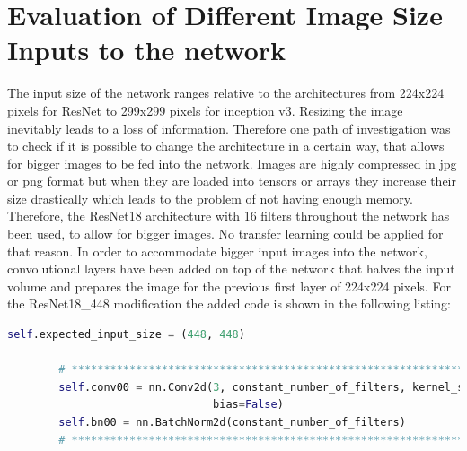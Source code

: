 \begin{table}[!h] \centering
{}
\caption{Resnet18 FiveCrop Implementation with and without pre-training. FINAL (regular) means ResNet18 with the resizing of the image instead of cropping and averaging}
\label{tbl:resnet18-randomnine}
\end{table}



\section{Evaluation of Different Image Size Inputs to the network}

The input size of the network ranges relative to the architectures from 224x224 pixels for ResNet to 299x299 pixels for inception v3. Resizing the image inevitably leads to a loss of information. Therefore one path of investigation was to check if it is possible to change the architecture in a certain way, that allows for bigger images to be fed into the network. Images are highly compressed in jpg or png format but when they are loaded into tensors or arrays they increase their size drastically which leads to the problem of not having enough memory. Therefore, the ResNet18 architecture with 16 filters throughout the network has been used, to allow for bigger images. No transfer learning could be applied for that reason. In order to accommodate bigger input images into the network, convolutional layers have been added on top of the network that halves the input volume and prepares the image for the previous first layer of 224x224 pixels. For the ResNet18\_448 modification the added code is shown in the following listing:

\begin{minipage}{\linewidth}
\begin{lstlisting}[language=Python, caption=Python example, basicstyle=\tiny]
        self.expected_input_size = (448, 448)

        # ************************************************************************************************
        self.conv00 = nn.Conv2d(3, constant_number_of_filters, kernel_size=7, stride=2, padding=3,
                                bias=False)
        self.bn00 = nn.BatchNorm2d(constant_number_of_filters)
        # ************************************************************************************************
\end{lstlisting}
\end{minipage}

